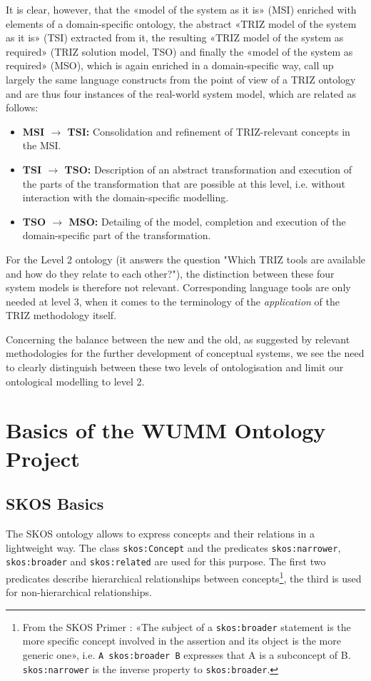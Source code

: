 \documentclass[11pt,a4paper]{article}
\begin{document}
It is clear, however, that the «model of the system as it is» (MSI) enriched
with elements of a domain-specific ontology, the abstract «TRIZ model of the
system as it is» (TSI) extracted from it, the resulting «TRIZ model of the
system as required» (TRIZ solution model, TSO) and finally the «model of the
system as required» (MSO), which is again enriched in a domain-specific way,
call up largely the same language constructs from the point of view of a TRIZ
ontology and are thus four instances of the real-world system model, which are
related as follows:
\begin{itemize}[noitemsep]
\item \textbf{MSI $\to$ TSI:} Consolidation and refinement of TRIZ-relevant
  concepts in the MSI.
\item \textbf{TSI $\to$ TSO:} Description of an abstract transformation and
  execution of the parts of the transformation that are possible at this
  level, i.e. without interaction with the domain-specific modelling.
\item \textbf{TSO $\to$ MSO:} Detailing of the model, completion and execution
  of the domain-specific part of the transformation.
\end{itemize}
For the Level 2 ontology (it answers the question "Which TRIZ tools are
available and how do they relate to each other?"), the distinction between
these four system models is therefore not relevant. Corresponding language
tools are only needed at level 3, when it comes to the terminology of the
\emph{application} of the TRIZ methodology itself.

Concerning the balance between the new and the old, as suggested by relevant
methodologies for the further development of conceptual systems, we see the
need to clearly distinguish between these two levels of ontologisation and
limit our ontological modelling to level 2.

\section{Basics of the WUMM Ontology Project}

\subsection{SKOS Basics}

The SKOS ontology allows to express concepts and their relations in a
lightweight way. The class \texttt{skos:Concept} and the predicates
\texttt{skos:narrower}, \texttt{skos:broader} and \texttt{skos:related} are
used for this purpose. The first two predicates describe hierarchical
relationships between concepts\footnote{From the SKOS Primer
  \cite{SKOS-Primer}: «The subject of a \texttt{skos:broader} statement is the
  more specific concept involved in the assertion and its object is the more
  generic one», i.e. \texttt{A skos:broader B} expresses that A is a
  subconcept of B.  \texttt{skos:narrower} is the inverse property to
  \texttt{skos:broader}.}, the third is used for non-hierarchical
relationships.
\end{document}
